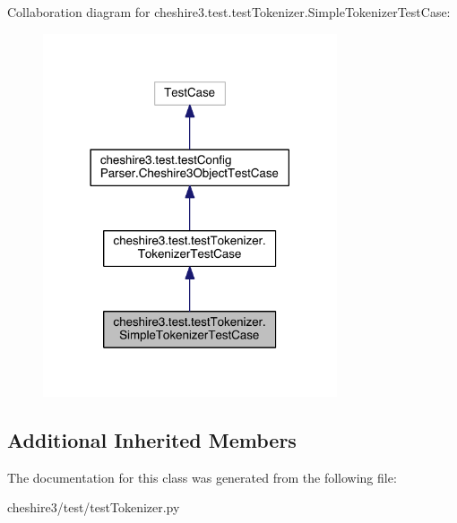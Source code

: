 Collaboration diagram for cheshire3.\-test.\-test\-Tokenizer.\-Simple\-Tokenizer\-Test\-Case\-:
\nopagebreak
\begin{figure}[H]
\begin{center}
\leavevmode
\includegraphics[width=246pt]{classcheshire3_1_1test_1_1test_tokenizer_1_1_simple_tokenizer_test_case__coll__graph}
\end{center}
\end{figure}
\subsection*{Additional Inherited Members}


The documentation for this class was generated from the following file\-:\begin{DoxyCompactItemize}
\item 
cheshire3/test/test\-Tokenizer.\-py\end{DoxyCompactItemize}
